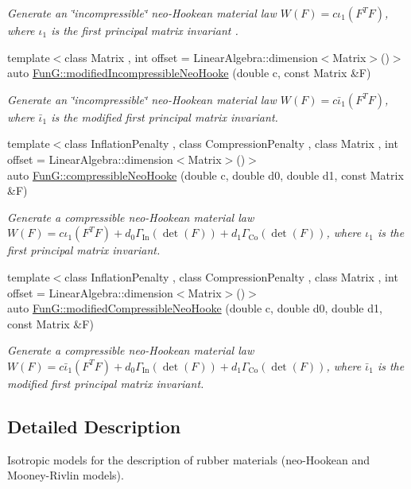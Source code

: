 \begin{DoxyCompactItemize}
\begin{DoxyCompactList}\small\item\em Generate an \char`\"{}incompressible\char`\"{} neo-\/\-Hookean material law $ W(F)=c\iota_1(F^T F) $, where $\iota_1$ is the first principal matrix invariant . \end{DoxyCompactList}\item 
\hypertarget{group__Rubber_gaf6f5ab6a379ef03d513acc5042731a01}{{\footnotesize template$<$class Matrix , int offset = Linear\-Algebra\-::dimension$<$\-Matrix$>$()$>$ }\\auto \hyperlink{group__Rubber_gaf6f5ab6a379ef03d513acc5042731a01}{Fun\-G\-::modified\-Incompressible\-Neo\-Hooke} (double c, const Matrix \&F)}\label{group__Rubber_gaf6f5ab6a379ef03d513acc5042731a01}

\begin{DoxyCompactList}\small\item\em Generate an \char`\"{}incompressible\char`\"{} neo-\/\-Hookean material law $ W(F)=c\bar\iota_1(F^T F) $, where $\bar\iota_1$ is the modified first principal matrix invariant. \end{DoxyCompactList}\item 
\hypertarget{group__Rubber_gac5c39cd9de55f4f0220a806cf28a7b30}{{\footnotesize template$<$class Inflation\-Penalty , class Compression\-Penalty , class Matrix , int offset = Linear\-Algebra\-::dimension$<$\-Matrix$>$()$>$ }\\auto \hyperlink{group__Rubber_gac5c39cd9de55f4f0220a806cf28a7b30}{Fun\-G\-::compressible\-Neo\-Hooke} (double c, double d0, double d1, const Matrix \&F)}\label{group__Rubber_gac5c39cd9de55f4f0220a806cf28a7b30}

\begin{DoxyCompactList}\small\item\em Generate a compressible neo-\/\-Hookean material law $ W(F)=c\iota_1(F^T F)+d_0\Gamma_\mathrm{In}(\det(F))+d_1\Gamma_\mathrm{Co}(\det(F)) $, where $\iota_1$ is the first principal matrix invariant. \end{DoxyCompactList}\item 
\hypertarget{group__Rubber_gac10942df03f037afdf0a81d330361a6b}{{\footnotesize template$<$class Inflation\-Penalty , class Compression\-Penalty , class Matrix , int offset = Linear\-Algebra\-::dimension$<$\-Matrix$>$()$>$ }\\auto \hyperlink{group__Rubber_gac10942df03f037afdf0a81d330361a6b}{Fun\-G\-::modified\-Compressible\-Neo\-Hooke} (double c, double d0, double d1, const Matrix \&F)}\label{group__Rubber_gac10942df03f037afdf0a81d330361a6b}

\begin{DoxyCompactList}\small\item\em Generate a compressible neo-\/\-Hookean material law $ W(F)=c\bar\iota_1(F^T F)+d_0\Gamma_\mathrm{In}(\det(F))+d_1\Gamma_\mathrm{Co}(\det(F)) $, where $\bar\iota_1$ is the modified first principal matrix invariant. \end{DoxyCompactList}\end{DoxyCompactItemize}


\subsection{Detailed Description}
Isotropic models for the description of rubber materials (neo-\/\-Hookean and Mooney-\/\-Rivlin models). 